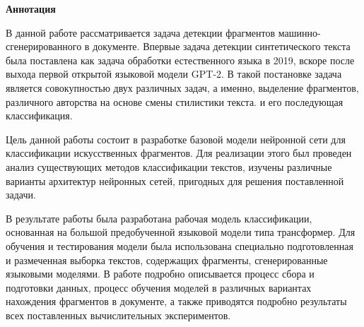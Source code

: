 \begin{center}
    \Large{\textbf{Аннотация}}
\end{center}
В данной работе рассматривается задача детекции фрагментов машинно-сгенерированного в документе. Впервые задача детекции синтетического текста  была поставлена как задача обработки естественного языка в 2019, вскоре после выхода первой открытой языковой модели GPT-2. В такой постановке задача является совокупностью двух различных задач, а именно, выделение фрагментов, различного авторства на основе смены стилистики текста. и его последующая классификация. 


Цель данной работы состоит в разработке базовой модели нейронной сети для классификации искусственных фрагментов. Для реализации этого был проведен анализ существующих методов классификации текстов, изучены различные варианты архитектур нейронных сетей, пригодных для решения поставленной задачи.


В результате работы была разработана рабочая модель классификации, основанная на большой предобученной языковой модели типа трансформер. Для обучения и тестирования модели была использована специально подготовленная и размеченная выборка текстов, содержащих фрагменты, сгенерированные языковыми моделями. В работе подробно описывается процесс сбора и подготовки данных, процесс обучения моделей в различных вариантах нахождения фрагментов в документе, а также приводятся подробно результаты всех поставленных вычислительных экспериментов.

